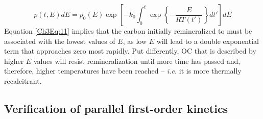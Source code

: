 %
\begin{equation}\label{Ch3Eq:11}
	p(t,E) dE = p_{0}(E) \exp \left[ - k_{0} \int_{0}^{t} \exp \left\{ - \frac{E}{RT(t')} \right\} dt' \right] dE
\end{equation}
%
Equation \ref{Ch3Eq:11} implies that the carbon initially remineralized to  must be associated with the lowest values of $E$, as low $E$ will lead to a double exponential term that approaches zero most rapidly. Put differently, OC that is described by higher $E$ values will resist remineralization until more time has passed and, therefore, higher temperatures have been reached -- \textit{i.e.} it is more thermally recalcitrant.

\subsection{Verification of parallel first-order kinetics}

